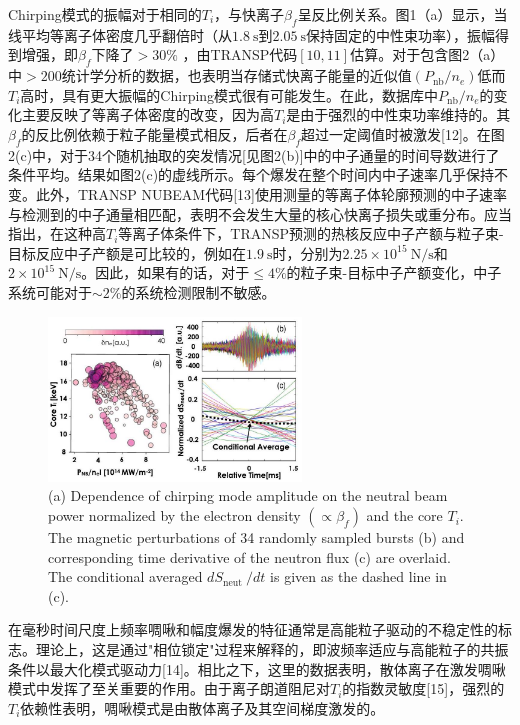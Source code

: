 \documentclass[oneside,onecolumn]{article}
\begin{document}
\begin{sloppypar}
  
 Chirping模式的振幅对于相同的$T_{i}$，与快离子$\beta_{f}$呈反比例关系。图1（a）显示，当线平均等离子体密度几乎翻倍时（从$1.8 \mathrm{~s}$到$2.05 \mathrm{~s}$保持固定的中性束功率），振幅得到增强，即$\beta_{f}$下降了$>30 \%$ ，由TRANSP代码$[10,11]$估算。对于包含图2（a）中$>200$统计学分析的数据，也表明当存储式快离子能量的近似值$\left(P_{\mathrm{nb}} / n_{e}\right)$低而$T_{i}$高时，具有更大振幅的Chirping模式很有可能发生。在此，数据库中$P_{\mathrm{nb}} / n_{e}$的变化主要反映了等离子体密度的改变，因为高$T_{i}$是由于强烈的中性束功率维持的。其$\beta_{f}$的反比例依赖于粒子能量模式相反，后者在$\beta_{f}$超过一定阈值时被激发[12]。在图2(c)中，对于34个随机抽取的突发情况[见图2(b)]中的中子通量的时间导数进行了条件平均。结果如图2(c)的虚线所示。每个爆发在整个时间内中子速率几乎保持不变。此外，TRANSP NUBEAM代码[13]使用测量的等离子体轮廓预测的中子速率与检测到的中子通量相匹配，表明不会发生大量的核心快离子损失或重分布。应当指出，在这种高$T_{i}$等离子体条件下，TRANSP预测的热核反应中子产额与粒子束-目标反应中子产额是可比较的，例如在$1.9 \mathrm{~s}$时，分别为$2.25 \times 10^{15} \mathrm{~N} / \mathrm{s}$和$2 \times 10^{15} \mathrm{~N} / \mathrm{s}$。因此，如果有的话，对于$\leq 4 \%$的粒子束-目标中子产额变化，中子系统可能对于$\sim 2 \%$的系统检测限制不敏感。
  \begin{figure}[htbp]
  	\centering
  	\includegraphics[max width=0.6\textwidth,max height=1.0\textheight]{2023_06_19_f8dbb752866ca158c73eg-2}
  	\caption{(a) Dependence of chirping mode amplitude on the neutral beam power normalized by the electron density $\left(\propto \beta_{f}\right)$ and the core $T_{i}$. The magnetic perturbations of 34 randomly sampled bursts (b) and corresponding time derivative of the neutron flux (c) are overlaid. The conditional averaged $d S_{\text {neut }} / d t$ is given as the dashed line in (c).}
  	\label{figure2}
  \end{figure}
  
  
 在毫秒时间尺度上频率啁啾和幅度爆发的特征通常是高能粒子驱动的不稳定性的标志。理论上，这是通过"相位锁定"过程来解释的，即波频率适应与高能粒子的共振条件以最大化模式驱动力[14]。相比之下，这里的数据表明，散体离子在激发啁啾模式中发挥了至关重要的作用。由于离子朗道阻尼对$T_{i}$的指数灵敏度[15]，强烈的$T_{i}$依赖性表明，啁啾模式是由散体离子及其空间梯度激发的。
  

\end{sloppypar}
\end{document}
